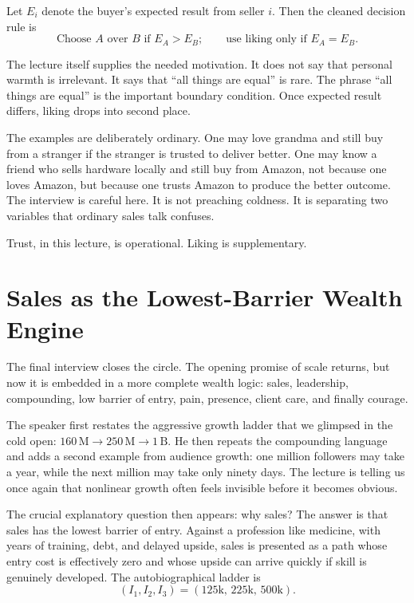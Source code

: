 Let \(E_i\) denote the buyer's expected result from seller \(i\). Then the cleaned decision rule is
\begin{equation}
\text{Choose } A \text{ over } B \text{ if } E_A > E_B;
\qquad
\text{use liking only if } E_A = E_B.
\end{equation}

The lecture itself supplies the needed motivation. It does not say that personal warmth is irrelevant. It says that ``all things are equal'' is rare. The phrase ``all things are equal'' is the important boundary condition. Once expected result differs, liking drops into second place.

The examples are deliberately ordinary. One may love grandma and still buy from a stranger if the stranger is trusted to deliver better. One may know a friend who sells hardware locally and still buy from Amazon, not because one loves Amazon, but because one trusts Amazon to produce the better outcome. The interview is careful here. It is not preaching coldness. It is separating two variables that ordinary sales talk confuses.

Trust, in this lecture, is operational. Liking is supplementary.

\section{Sales as the Lowest-Barrier Wealth Engine}

The final interview closes the circle. The opening promise of scale returns, but now it is embedded in a more complete wealth logic: sales, leadership, compounding, low barrier of entry, pain, presence, client care, and finally courage.

The speaker first restates the aggressive growth ladder that we glimpsed in the cold open: \(160\,\text{M} \to 250\,\text{M} \to 1\,\text{B}\). He then repeats the compounding language and adds a second example from audience growth: one million followers may take a year, while the next million may take only ninety days. The lecture is telling us once again that nonlinear growth often feels invisible before it becomes obvious.

The crucial explanatory question then appears: why sales? The answer is that sales has the lowest barrier of entry. Against a profession like medicine, with years of training, debt, and delayed upside, sales is presented as a path whose entry cost is effectively zero and whose upside can arrive quickly if skill is genuinely developed. The autobiographical ladder is
\begin{equation}
(I_1, I_2, I_3) = (125\text{k},\,225\text{k},\,500\text{k}).
\end{equation}

